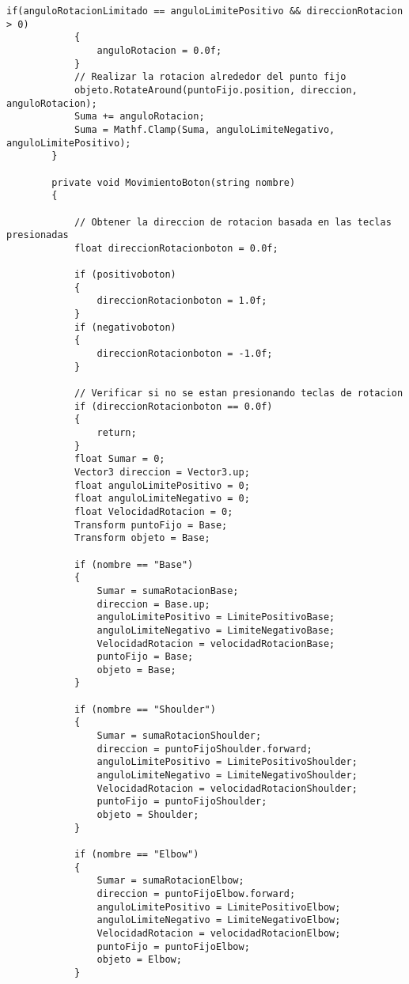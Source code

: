 \begin{lstlisting}[frame=single]
            if(anguloRotacionLimitado == anguloLimitePositivo && direccionRotacion > 0)
            {
                anguloRotacion = 0.0f;
            }
            // Realizar la rotacion alrededor del punto fijo
            objeto.RotateAround(puntoFijo.position, direccion, anguloRotacion);
            Suma += anguloRotacion;
            Suma = Mathf.Clamp(Suma, anguloLimiteNegativo, anguloLimitePositivo);
        }

        private void MovimientoBoton(string nombre)
        {
            
            // Obtener la direccion de rotacion basada en las teclas presionadas
            float direccionRotacionboton = 0.0f;

            if (positivoboton)
            {
                direccionRotacionboton = 1.0f;
            }
            if (negativoboton)
            {
                direccionRotacionboton = -1.0f;
            }

            // Verificar si no se estan presionando teclas de rotacion
            if (direccionRotacionboton == 0.0f)
            {
                return;
            }
            float Sumar = 0;
            Vector3 direccion = Vector3.up;
            float anguloLimitePositivo = 0;
            float anguloLimiteNegativo = 0;
            float VelocidadRotacion = 0;
            Transform puntoFijo = Base;
            Transform objeto = Base;

            if (nombre == "Base")
            {
                Sumar = sumaRotacionBase;
                direccion = Base.up;
                anguloLimitePositivo = LimitePositivoBase;
                anguloLimiteNegativo = LimiteNegativoBase;
                VelocidadRotacion = velocidadRotacionBase;
                puntoFijo = Base;
                objeto = Base;
            }

            if (nombre == "Shoulder")
            {
                Sumar = sumaRotacionShoulder;
                direccion = puntoFijoShoulder.forward;
                anguloLimitePositivo = LimitePositivoShoulder;
                anguloLimiteNegativo = LimiteNegativoShoulder;
                VelocidadRotacion = velocidadRotacionShoulder;
                puntoFijo = puntoFijoShoulder;
                objeto = Shoulder;
            }

            if (nombre == "Elbow")
            {
                Sumar = sumaRotacionElbow;
                direccion = puntoFijoElbow.forward;
                anguloLimitePositivo = LimitePositivoElbow;
                anguloLimiteNegativo = LimiteNegativoElbow;
                VelocidadRotacion = velocidadRotacionElbow;
                puntoFijo = puntoFijoElbow;
                objeto = Elbow;
            }


\end{lstlisting}
